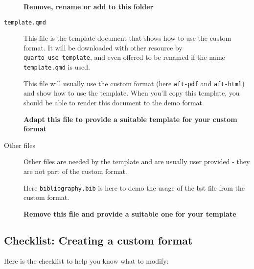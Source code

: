\documentclass[manuscript,screen,review]{acmart}
\begin{document}
\begin{description}
\textbf{Remove, rename or add to this folder}
\item[\texttt{template.qmd}]
This file is the template document that shows how to use the custom
format. It will be downloaded with other resource by
\texttt{quarto\ use\ template}, and even offered to be renamed if the
name \texttt{template.qmd} is used.

This file will usually use the custom format (here \texttt{aft-pdf} and
\texttt{aft-html}) and show how to use the template. When you'll copy
this template, you should be able to render this document to the demo
format.

\textbf{Adapt this file to provide a suitable template for your custom
format}
\item[Other files]
Other files are needed by the template and are usually user provided -
they are not part of the custom format.

Here \texttt{bibliography.bib} is here to demo the usage of the bst file
from the custom format.

\textbf{Remove this file and provide a suitable one for your template}
\end{description}

\newpage{}

\subsection{Checklist: Creating a custom
format}\label{checklist-creating-a-custom-format}

Here is the checklist to help you know what to modify:
\end{document}
